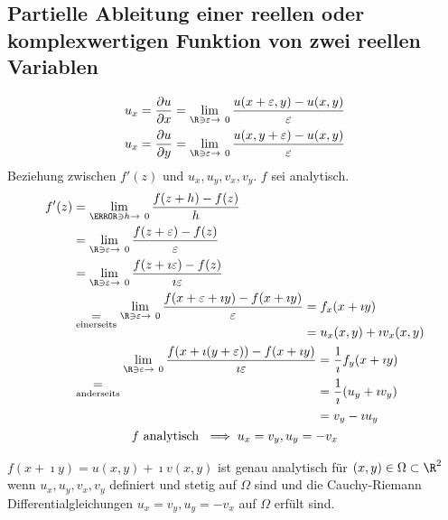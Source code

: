 \subsection{Partielle Ableitung einer reellen oder komplexwertigen Funktion von zwei reellen Variablen}
\begin{gather*}
	u_x = \frac{\partial u}{\partial x} = \lim_{\R \ni \epsilon \rightarrow 0} \frac{u(x + \epsilon , y) - u( x , y )}{\epsilon} \\
	u_x = \frac{\partial u}{\partial y} = \lim_{\R \ni \epsilon \rightarrow 0} \frac{u(x , y + \epsilon) - u( x , y )}{\epsilon}
\end{gather*}
Beziehung zwischen $f'(z)$ und $u_x , u_y , v_x , v_y$. $f$ sei analytisch.
\begin{gather*}
	\begin{split}
		f'(z)	&= \lim_{\C \ni h \rightarrow 0} \frac{f(z + h) - f(z)}{h} \\
			&= \lim_{\R \ni \epsilon \rightarrow 0} \frac{f(z + \epsilon) - f(z)}{\epsilon} \\
			&= \lim_{\R \ni \epsilon \rightarrow 0} \frac{f(z + \imath\epsilon) - f(z)}{\imath\epsilon} \\
			&\underset{\text{einerseits}}{=} \begin{split}
				\lim_{\R \ni \epsilon \rightarrow 0} \frac{f(x + \epsilon + \imath y) - f(x + \imath y)}{\epsilon}	&= f_x(x + \imath y) \\
																					&= u_x(x,y) + \imath v_x(x,y)
			\end{split} \\
			&\underset{\text{anderseits}}{=} \begin{split}
				\lim_{\R \ni \epsilon \rightarrow 0} \frac{f(x + \imath(y + \epsilon)) - f(x + \imath y)}{\imath\epsilon}
					&= \frac{1}{\imath} f_y(x + \imath y) \\
					&= \frac{1}{\imath} (u_y + \imath v_y) \\
					&= v_y - \imath u_y
			\end{split}
	\end{split} \\
	f \text{ analytisch } \implies u_x = v_y , u_y = -v_x
\end{gather*}
\begin{satz*}
	$f(x + \imath y) = u(x,y) + \imath v(x,y)$ ist genau analytisch für $(x,y) \in \Omega \subset \R^2$ wenn $u_x , u_y , v_x , v_y$ definiert und stetig auf $\Omega$ sind und die Cauchy-Riemann Differentialgleichungen $u_x = v_y , u_y = -v_x$ auf $\Omega$ erfült sind.
\end{satz*}
